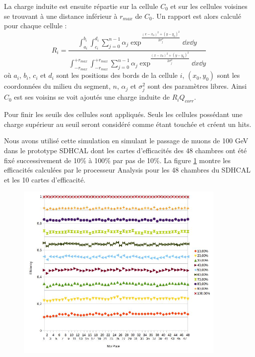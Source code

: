  La charge induite est ensuite répartie sur la cellule $C_0$ et sur les cellules voisines se trouvant à une distance inférieur à $r_{max}$ de $C_0$. Un rapport est alors calculé pour chaque cellule :
 \begin{equation}
 R_i=\frac{\int_{a_i}^{b_i}\int_{c_i}^{d_i}\sum_{j=0}^{n-1}\alpha_j\exp^{\frac{(x-x_0)^2+(y-y_0)^2}{2\sigma_j^2}}\dd x\dd y}{\int_{-r_{max}}^{+r_{max}}\int_{-r_{max}}^{+r_{max}}\sum_{j=0}^{n-1}\alpha_j\exp^{\frac{(x-x_0)^2+(y-y_0)^2}{2\sigma_j^2}}\dd x\dd y}
 \end{equation}
où $a_i$, $b_i$, $c_i$ et $d_i$ sont les positions des bords de la cellule $i$, $(x_0,y_0)$ sont les coordonnées du milieu du segment, $n$, $\alpha_j$ et $\sigma_j^2$ sont des paramètres libres. Ainsi $C_0$ est ses voisins se voit ajoutés une charge induite de $R_iQ_{corr}$.

Pour finir les seuils des cellules sont appliqués. Seuls les cellules possédant une charge supérieur au seuil seront considéré comme étant touchée et créent un hits.

Nous avons utilisé cette simulation en simulant le passage de muons de 100 GeV dans le prototype SDHCAL dont les cartes d'efficacités des 48 chambres ont été fixé successivement de 10\% à 100\% par pas de 10\%. La figure \ref{effisimul} montre les efficacités calculées par le processeur Analysis pour les 48 chambres du SDHCAL et les 10 cartes d'efficacité.

\begin{figure}[ht!]
	\centering
	\includegraphics[width=0.9\textwidth]{GLA/effisimul.jpg}
	\label{effisimul}
\end{figure}

